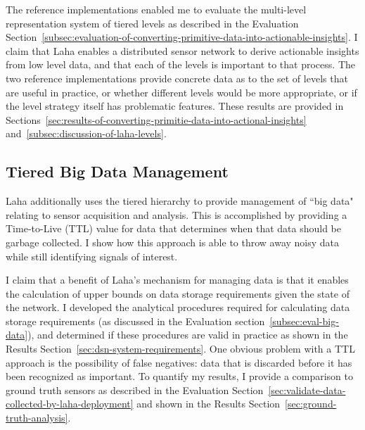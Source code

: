 The reference implementations enabled me to evaluate the multi-level representation system of tiered levels as described in the Evaluation Section~\ref{subsec:evaluation-of-converting-primitive-data-into-actionable-insights}. I claim that Laha enables a distributed sensor network to derive actionable insights from low level data, and that each of the levels is important to that process. The two reference implementations provide concrete data as to the set of levels that are useful in practice, or whether different levels would be more appropriate, or if the level strategy itself has problematic features. These results are provided in Sections~\ref{sec:results-of-converting-primitie-data-into-actional-insights} and~\ref{subsec:discussion-of-laha-levels}.

\subsection{Tiered Big Data Management}\label{subsec:tiered-big-data-management}
Laha additionally uses the tiered hierarchy to provide management of ``big data" relating to sensor acquisition and analysis. This is accomplished by providing a Time-to-Live (TTL) value for data that determines when that data should be garbage collected. I show how this approach is able to throw away noisy data while still identifying signals of interest.

I claim that a benefit of Laha's mechanism for managing data is that it enables the calculation of upper bounds on data storage requirements given the state of the network. I developed the analytical procedures required for calculating data storage requirements (as discussed in the Evaluation section~\ref{subsec:eval-big-data}), and determined if these procedures are valid in practice as shown in the Results Section~\ref{sec:dsn-system-requirements}. One obvious problem with a TTL approach is the possibility of false negatives: data that is discarded before it has been recognized as important. To quantify my results, I provide a comparison to ground truth sensors as described in the Evaluation Section~\ref{sec:validate-data-collected-by-laha-deployment} and shown in the Results Section~\ref{sec:ground-truth-analysis}.

